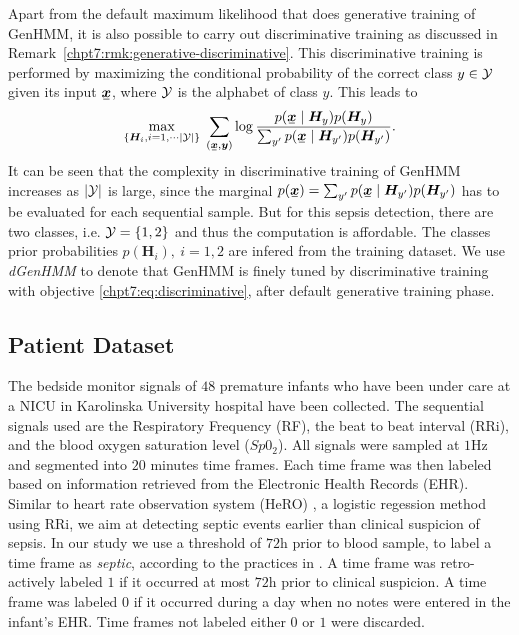 Apart from the default maximum likelihood that does generative training of GenHMM, it is also possible to carry out discriminative training as discussed in Remark~\ref{chpt7:rmk:generative-discriminative}.
This discriminative training is performed by maximizing the conditional probability of the correct class $y\in \mathcal{Y}$ given its input $\ubm{x}$, where $\mathcal{Y}$ is the alphabet of class $y$. This leads to
\begin{equation} \label{chpt7:eq:discriminative}
\umax{\left\{ \bm{H}_i, i=1, \cdots \abs{\Yy} \right\}}{}\sum_{(\ubm{x},\bm{y})} \log \frac{p(\ubm{x}\mid\bm{H}_{{y}})p(\bm{H}_{{y}})}{\sum_{y^{\prime}}p(\ubm{x}\mid\bm{H}_{y^{\prime}})p(\bm{H}_{y^{\prime}})}.
\end{equation}
It can be seen that the complexity in discriminative training of GenHMM increases as $| \mathcal{Y} |$ is large, since the marginal $p(\ubm{x})= \sum_{y^{\prime}}p(\ubm{x}\mid\bm{H}_{y^{\prime}})p(\bm{H}_{y^{\prime}})$ has to be evaluated for each sequential sample. But for this sepsis detection, there are two classes, i.e. $\mathcal{Y} = \left\{ 1,2 \right\}$ and thus the computation is affordable.
The classes prior probabilities $p(\bm{H}_{i}),~i=1,2$ are infered from the training dataset. We use \textit{dGenHMM} to denote that GenHMM is finely tuned by discriminative training with objective \eqref{chpt7:eq:discriminative}, after default generative training phase.

\subsection{Patient Dataset}
The bedside monitor signals of $48$ premature infants who have been under care at a NICU in Karolinska University hospital have been collected.
The sequential signals used are the Respiratory Frequency (RF), the beat to beat interval (RRi), and the blood oxygen saturation level ($Sp0_2$).
All signals were sampled at $1$Hz and segmented into $20$ minutes time frames.
Each time frame was then labeled based on information retrieved from the Electronic Health Records (EHR).
Similar to heart rate observation system (HeRO) \cite{hicksHeartRateObservation2013, griffinHeartRateCharacteristics2005}, a logistic regession method using RRi, we aim at detecting septic events earlier than clinical suspicion of sepsis.
In our study we use a threshold of $72$h prior to blood sample, to label a time frame as \textit{septic}, according to the practices in \cite{gurMathematicalAlgorithmDetection2014}.
A time frame was retro-actively labeled $1$ if it occurred at most $72$h prior to clinical suspicion.
A time frame was labeled $0$ if it occurred during a day when no notes were entered in the infant's EHR.
Time frames not labeled either $0$ or $1$ were discarded.

